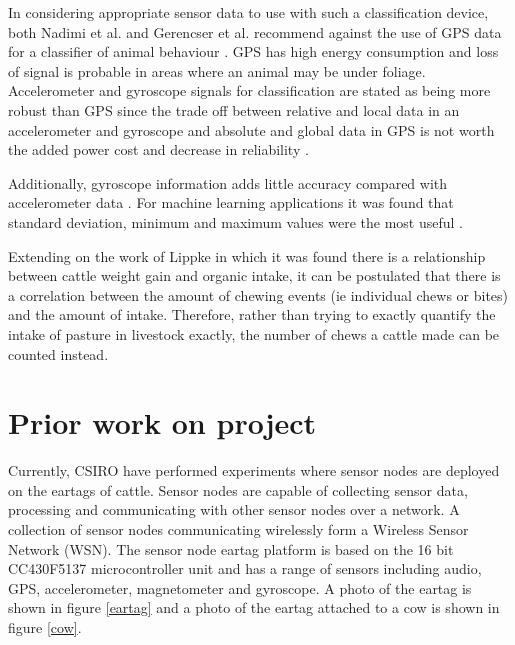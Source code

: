 In considering appropriate sensor data to use with such a classification device, both Nadimi et al. and Gerencser et al. recommend against the use of GPS data for a classifier of animal behaviour \cite{Nadimi2012} \cite{Gerencser2013}. GPS has high energy consumption and loss of signal is probable in areas where an animal may be under foliage. Accelerometer and gyroscope signals for classification are stated as being more robust than GPS since the trade off between relative and local data in an accelerometer and gyroscope and absolute and global data in GPS is not worth the added power cost and decrease in reliability \cite{Gerencser2013}.

Additionally, gyroscope information adds little accuracy compared with accelerometer data \cite{Gerencser2013}. For machine learning applications it was found that standard deviation, minimum and maximum values were the most useful \cite{Gerencser2013}. 

Extending on the work of Lippke \cite{Lippke1980} in which it was found there is a relationship between cattle weight gain and organic intake, it can be postulated that there is a correlation between the amount of chewing events (ie individual chews or bites) and the amount of intake. Therefore, rather than trying to exactly quantify the intake of pasture in livestock exactly, the number of chews a cattle made can be counted instead.

\section{Prior work on project}
\label{sec:prior work}
Currently, CSIRO have performed experiments where sensor nodes are deployed on the eartags of cattle. Sensor nodes are capable of collecting sensor data, processing and communicating with other sensor nodes over a network. A collection of sensor nodes communicating wirelessly form a Wireless Sensor Network (WSN). The sensor node eartag platform is based on the 16 bit CC430F5137 microcontroller unit and has a range of sensors including audio, GPS, accelerometer, magnetometer and gyroscope. A photo of the eartag is shown in figure \ref{eartag} and a photo of the eartag attached to a cow is shown in figure \ref{cow}.


